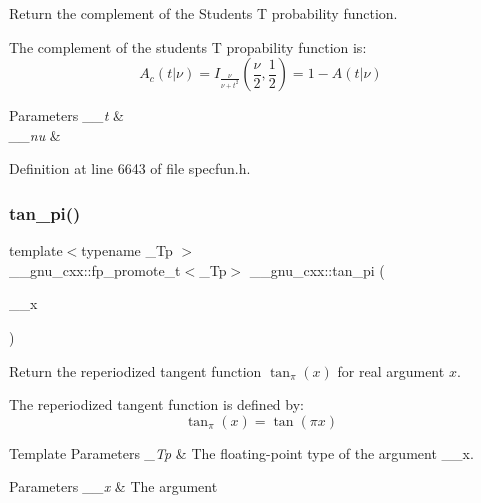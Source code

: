 Return the complement of the Students T probability function. 

The complement of the students T propability function is\+: \[ A_c(t|\nu) = I_{\frac{\nu}{\nu + t^2}}(\frac{\nu}{2}, \frac{1}{2}) = 1 - A(t|\nu) \]


\begin{DoxyParams}{Parameters}
{\em \+\_\+\+\_\+t} & \\
\hline
{\em \+\_\+\+\_\+nu} & \\
\hline
\end{DoxyParams}


Definition at line 6643 of file specfun.\+h.

\mbox{\label{group__gnu__math__spec__func_ga12855bd62fe6a955ef0d1d5e92c85ba9}} 
\subsubsection{\texorpdfstring{tan\+\_\+pi()}{tan\_pi()}}
{\footnotesize\ttfamily template$<$typename \+\_\+\+Tp $>$ \\
\+\_\+\+\_\+gnu\+\_\+cxx\+::fp\+\_\+promote\+\_\+t$<$\+\_\+\+Tp$>$ \+\_\+\+\_\+gnu\+\_\+cxx\+::tan\+\_\+pi (\begin{DoxyParamCaption}\item[{\+\_\+\+Tp}]{\+\_\+\+\_\+x }\end{DoxyParamCaption})\hspace{0.3cm}{\ttfamily [inline]}}

Return the reperiodized tangent function $ \tan_\pi(x) $ for real argument $ x $.

The reperiodized tangent function is defined by\+: \[ \tan_\pi(x) = \tan(\pi x) \]


\begin{DoxyTemplParams}{Template Parameters}
{\em \+\_\+\+Tp} & The floating-\/point type of the argument {\ttfamily \+\_\+\+\_\+x}. \\
\hline
\end{DoxyTemplParams}

\begin{DoxyParams}{Parameters}
{\em \+\_\+\+\_\+x} & The argument \\
\hline
\end{DoxyParams}


